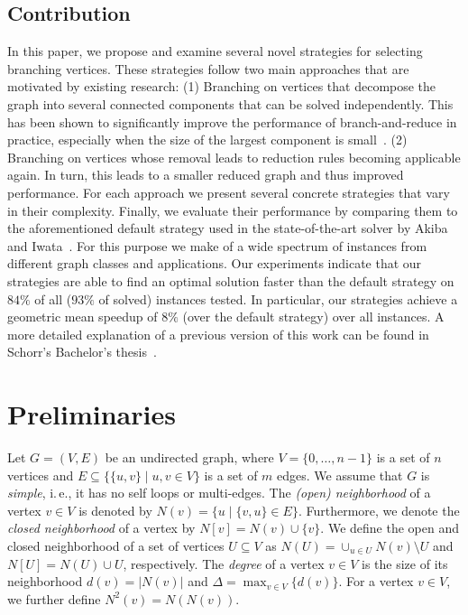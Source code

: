 \documentclass[a4paper,UKenglish,cleveref, autoref, thm-restate]{lipics-v2021}
\newcommand{\ie}{i.\,e.,\xspace}
\begin{document}
\subsection{Contribution}
In this paper, we propose and examine several novel strategies for selecting branching vertices.
These strategies follow two main approaches that are motivated by existing research: (1) Branching on vertices that decompose the graph into several connected components that can be solved independently.
This has been shown to significantly improve the performance of branch-and-reduce in practice, especially when the size of the largest component is small~\cite{alsahafy2020computing}.
(2) Branching on vertices whose removal leads to reduction rules becoming applicable again.
In turn, this leads to a smaller reduced graph and thus improved performance.
For each approach we present several concrete strategies that vary in their complexity.
Finally, we evaluate their performance by comparing them to the aforementioned default strategy used in the state-of-the-art solver by Akiba and Iwata~\cite{AkibaIwata}.
For this purpose we make of a wide spectrum of instances from different graph classes and applications.
Our experiments indicate that our strategies are able to find an optimal
solution faster than the default strategy on $84\%$ of all ($93\%$ of solved)
instances tested.
In particular, our strategies achieve a geometric mean speedup of $8\%$ (over the default strategy) over all instances.
A more detailed explanation of a previous version of this work
can be found in Schorr's Bachelor's thesis~\cite{schorr2020improved}.

\section{Preliminaries}
Let $G=(V,E)$ be an undirected graph, where $V = \{0, \ldots, n-1\}$ is a set of $n$ vertices and $E \subseteq  \{\{u,v\} \mid u,v \in V\}$ is a set of $m$ edges. 
We assume that $G$ is \emph{simple}, \ie it has no self loops or multi-edges.
The \emph{(open) neighborhood} of a vertex $v \in V$ is denoted by $N(v) = \{u \mid \{v,u\} \in E\}$.
Furthermore, we denote the \emph{closed neighborhood} of a vertex by $N[v]=N(v) \cup \{v\}$.
We define the open and closed neighborhood of a set of vertices $U \subseteq V$
as $N(U) = \cup_{u \in U} N(v) \setminus U$ and $N[U] = N(U) \cup U$, respectively.
The \emph{degree} of a vertex $v \in V$ is the size of its neighborhood $d(v) =
|N(v)|$ and $\Delta =
\max_{v \in V} \{d(v)\}$.
For a vertex $v \in V$, we further define $N^2(v) = N(N(v))$.
\end{document}
